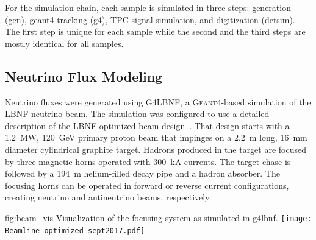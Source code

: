 For the simulation chain, each sample is simulated in three steps: generation (gen), {\sc geant4} tracking (g4), TPC signal simulation, and digitization (detsim). The first step is unique for each sample while the second and the third steps are mostly identical for all samples. 

\subsection{Neutrino Flux Modeling}
\label{sec:tools-mc-flux}

Neutrino fluxes were generated using G4LBNF, a \textsc{Geant}4\xspace-based simulation of the LBNF neutrino beam.  The simulation was configured to use a detailed description of the LBNF optimized beam design~\cite{optimizedbeamcdr}.  That design starts with a \SI{1.2}{MW}, \SI{120}{\GeV} primary proton beam that impinges on a \SI{2.2}{m} long, \SI{16}{mm} diameter cylindrical graphite target.  Hadrons produced in the target are focused by three magnetic horns operated with \SI{300}{kA} currents.  The target chase is followed by a \SI{194}{m} helium-filled decay pipe and a hadron absorber.  The focusing horns can be operated in forward or reverse current configurations, creating neutrino and antineutrino beams, respectively.   

\begin{dunefigure}{fig:beam_vis}
{Visualization of the focusing system as simulated in g4lbnf.}
    \texttt{[image: Beamline\_optimized\_sept2017.pdf]}\end{dunefigure}



